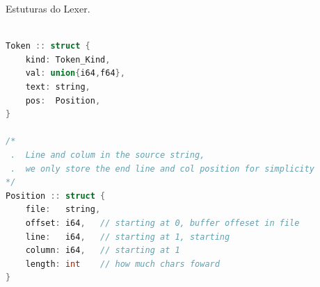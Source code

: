 \begin{codigo}[htb]
        \caption{\small Estuturas do Lexer. }
        \label{lexer-structs}
  \begin{lstlisting}[language=C++]

Token :: struct {
    kind: Token_Kind,
    val: union{i64,f64},
    text: string,
    pos:  Position,
}

/*
 .  Line and colum in the source string,
 .  we only store the end line and col position for simplicity
*/
Position :: struct {
    file:   string,
    offset: i64,   // starting at 0, buffer offeset in file
    line:   i64,   // starting at 1, starting
    column: i64,   // starting at 1
    length: int    // how much chars foward
}
    
  \end{lstlisting}
\end{codigo}


